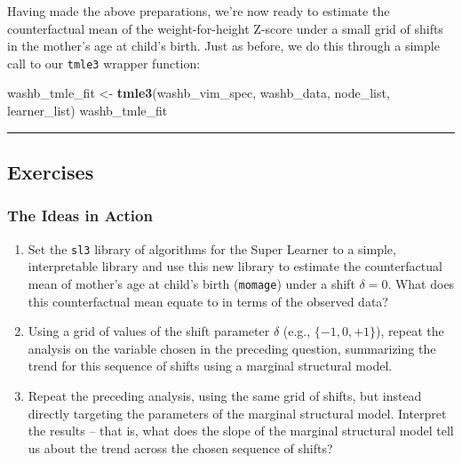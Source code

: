 \documentclass[12pt, krantz2,]{krantz}
\newenvironment{Shaded}{\begin{snugshade}}{\end{snugshade}}
\newcommand{\KeywordTok}[1]{\textcolor[rgb]{0.27,0.27,0.27}{\textbf{#1}}}
\newcommand{\NormalTok}[1]{#1}
\newcommand{\StringTok}[1]{\textcolor[rgb]{0.5,0.5,0.5}{#1}}
\theoremstyle{definition}
\theoremstyle{definition}
\theoremstyle{definition}
\newcommand{\1}{\mathbbm{1}}
\begin{document}
Having made the above preparations, we're now ready to estimate the
counterfactual mean of the weight-for-height Z-score under a small grid of
shifts in the mother's age at child's birth. Just as before, we do this through
a simple call to our \texttt{tmle3} wrapper function:

\begin{Shaded}
\begin{Highlighting}[]
\NormalTok{washb_tmle_fit <-}\StringTok{ }\KeywordTok{tmle3}\NormalTok{(washb_vim_spec, washb_data, node_list, learner_list)}
\NormalTok{washb_tmle_fit}
\end{Highlighting}
\end{Shaded}

\begin{center}\rule{0.5\linewidth}{0.5pt}\end{center}

\hypertarget{exercises-3}{%
\subsection{Exercises}\label{exercises-3}}

\hypertarget{the-ideas-in-action-1}{%
\subsubsection{The Ideas in Action}\label{the-ideas-in-action-1}}

\begin{enumerate}
\def\labelenumi{\arabic{enumi}.}
\item
  Set the \texttt{sl3} library of algorithms for the Super Learner to a simple,
  interpretable library and use this new library to estimate the counterfactual
  mean of mother's age at child's birth (\texttt{momage}) under a shift \(\delta = 0\).
  What does this counterfactual mean equate to in terms of the observed data?
\item
  Using a grid of values of the shift parameter \(\delta\) (e.g., \(\{-1, 0, +1\}\)), repeat the analysis on the variable chosen in the preceding question,
  summarizing the trend for this sequence of shifts using a marginal structural
  model.
\item
  Repeat the preceding analysis, using the same grid of shifts, but instead
  directly targeting the parameters of the marginal structural model. Interpret
  the results -- that is, what does the slope of the marginal structural model
  tell us about the trend across the chosen sequence of shifts?
\end{enumerate}
\end{document}
